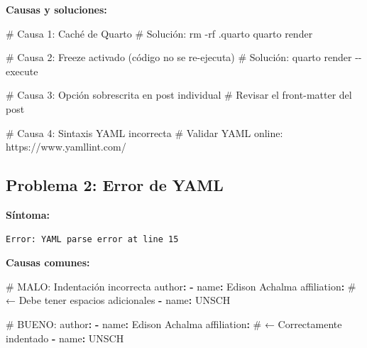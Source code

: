 \documentclass[
  doc,
  floatsintext,
  longtable,
  a4paper,
  nolmodern,
  notxfonts,
  notimes,
  12pt,
  colorlinks=true,linkcolor=blue,citecolor=blue,urlcolor=blue]{apa7}
\newenvironment{Shaded}{\begin{snugshade}}{\end{snugshade}}
\newcommand{\AttributeTok}[1]{\textcolor[rgb]{0.40,0.45,0.13}{#1}}
\newcommand{\CommentTok}[1]{\textcolor[rgb]{0.37,0.37,0.37}{#1}}
\newcommand{\ExtensionTok}[1]{\textcolor[rgb]{0.00,0.23,0.31}{#1}}
\newcommand{\FunctionTok}[1]{\textcolor[rgb]{0.28,0.35,0.67}{#1}}
\newcommand{\KeywordTok}[1]{\textcolor[rgb]{0.00,0.23,0.31}{\textbf{#1}}}
\newcommand{\NormalTok}[1]{\textcolor[rgb]{0.00,0.23,0.31}{#1}}
\begin{document}
\textbf{Causas y soluciones:}

\begin{Shaded}
\begin{Highlighting}[]
\CommentTok{\# Causa 1: Caché de Quarto}
\CommentTok{\# Solución:}
\FunctionTok{rm} \AttributeTok{{-}rf}\NormalTok{ .quarto}
\ExtensionTok{quarto}\NormalTok{ render}

\CommentTok{\# Causa 2: Freeze activado (código no se re{-}ejecuta)}
\CommentTok{\# Solución:}
\ExtensionTok{quarto}\NormalTok{ render }\AttributeTok{{-}{-}execute}

\CommentTok{\# Causa 3: Opción sobrescrita en post individual}
\CommentTok{\# Revisar el front{-}matter del post}

\CommentTok{\# Causa 4: Sintaxis YAML incorrecta}
\CommentTok{\# Validar YAML online: https://www.yamllint.com/}
\end{Highlighting}
\end{Shaded}

\subsection{Problema 2: Error de YAML}\label{problema-2-error-de-yaml}

\textbf{Síntoma:}

\begin{verbatim}
Error: YAML parse error at line 15
\end{verbatim}

\textbf{Causas comunes:}

\begin{Shaded}
\begin{Highlighting}[]
\CommentTok{\#  MALO: Indentación incorrecta}
\FunctionTok{author}\KeywordTok{:}
\AttributeTok{  }\KeywordTok{{-}}\AttributeTok{ }\FunctionTok{name}\KeywordTok{:}\AttributeTok{ Edison Achalma}
\AttributeTok{  }\FunctionTok{affiliation}\KeywordTok{:}\CommentTok{           \# ← Debe tener espacios adicionales}
\AttributeTok{    }\KeywordTok{{-}}\AttributeTok{ }\FunctionTok{name}\KeywordTok{:}\AttributeTok{ UNSCH}

\CommentTok{\# BUENO:}
\FunctionTok{author}\KeywordTok{:}
\AttributeTok{  }\KeywordTok{{-}}\AttributeTok{ }\FunctionTok{name}\KeywordTok{:}\AttributeTok{ Edison Achalma}
\AttributeTok{    }\FunctionTok{affiliation}\KeywordTok{:}\CommentTok{         \# ← Correctamente indentado}
\AttributeTok{      }\KeywordTok{{-}}\AttributeTok{ }\FunctionTok{name}\KeywordTok{:}\AttributeTok{ UNSCH}
\end{Highlighting}
\end{Shaded}
\end{document}
